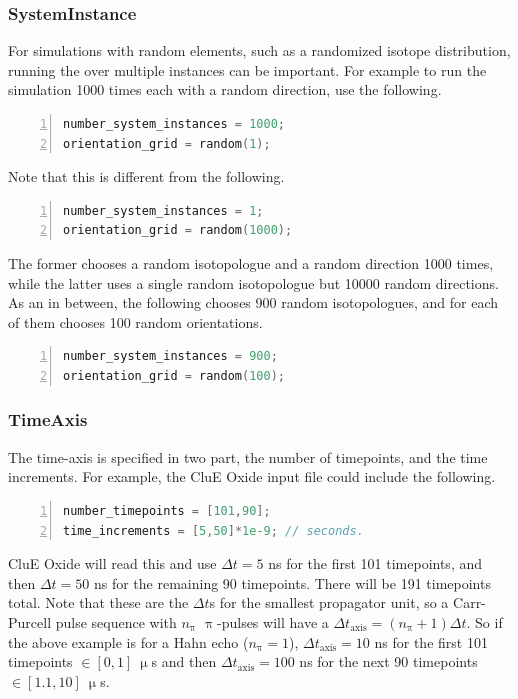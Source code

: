 \documentclass{book}
\begin{document}
\subsubsection{SystemInstance} %
For simulations with random elements, such as a randomized isotope
distribution, running the over multiple instances can be important.
For example to run the simulation 1000 times each with a random direction,
use the following.  
\begin{lstlisting}[frame=single,numbers=left,language=c]
number_system_instances = 1000;
orientation_grid = random(1);
\end{lstlisting}
Note that this is different from the following.
\begin{lstlisting}[frame=single,numbers=left,language=c]
number_system_instances = 1;
orientation_grid = random(1000);
\end{lstlisting}
The former chooses a random isotopologue and a random direction 1000 times,
while the latter uses a single random isotopologue but 10000 random directions.
As an in between, the following chooses 900 random isotopologues, and for
each of them chooses 100 random orientations.
\begin{lstlisting}[frame=single,numbers=left,language=c]
number_system_instances = 900;
orientation_grid = random(100);
\end{lstlisting}

\subsubsection{TimeAxis} %
The time-axis is specified in two part, the number of timepoints, and 
the time increments.  For example, the CluE Oxide input file could include the
following.  
\begin{lstlisting}[frame=single,numbers=left,language=c]
number_timepoints = [101,90];
time_increments = [5,50]*1e-9; // seconds.
\end{lstlisting}
CluE Oxide will read this and use $\Delta t = 5$ ns for the first 101 timepoints,
and then $\Delta t = 50$ ns for the remaining 90 timepoints.  
There will be 191 timepoints total.  Note that these are the $\Delta t$s for 
the smallest propagator unit, so a Carr-Purcell pulse sequence with $n_\uppi$
$\uppi$-pulses will have a $\Delta t_\text{axis} = (n_\uppi +1 )\Delta t$.
So if the above example is for a Hahn echo ($n_\uppi = 1$), 
$\Delta t_\text{axis} = 10$ ns for the first 101 timepoints $\in [0, 1]\ \upmu$s 
and then $\Delta t_\text{axis} = 100$ ns for the next 90 timepoints
$\in [1.1, 10]\ \upmu$s.
\end{document}
